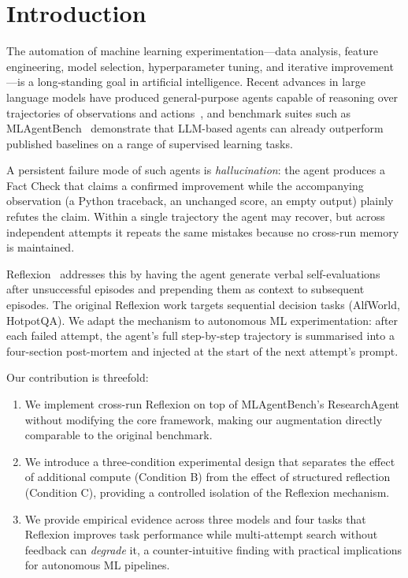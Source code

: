 \documentclass[conference]{IEEEtran}
\begin{document}
\section{Introduction}

The automation of machine learning experimentation---data analysis, feature
engineering, model selection, hyperparameter tuning, and iterative
improvement---is a long-standing goal in artificial intelligence. Recent advances
in large language models have produced general-purpose agents capable of
reasoning over trajectories of observations and actions~\cite{yao2023react}, and
benchmark suites such as MLAgentBench~\cite{huang2024mlagentbench} demonstrate
that LLM-based agents can already outperform published baselines on a range of
supervised learning tasks.

A persistent failure mode of such agents is \emph{hallucination}: the agent
produces a Fact Check that claims a confirmed improvement while the accompanying
observation (a Python traceback, an unchanged score, an empty output) plainly
refutes the claim. Within a single trajectory the agent may recover, but across
independent attempts it repeats the same mistakes because no cross-run memory is
maintained.

Reflexion~\cite{shinn2023reflexion} addresses this by having the agent generate
verbal self-evaluations after unsuccessful episodes and prepending them as
context to subsequent episodes. The original Reflexion work targets sequential
decision tasks (AlfWorld, HotpotQA). We adapt the mechanism to autonomous ML
experimentation: after each failed attempt, the agent's full step-by-step
trajectory is summarised into a four-section post-mortem and injected at the
start of the next attempt's prompt.

Our contribution is threefold:
\begin{enumerate}
  \item We implement cross-run Reflexion on top of MLAgentBench's
        ResearchAgent without modifying the core framework, making our
        augmentation directly comparable to the original benchmark.
  \item We introduce a three-condition experimental design that separates the
        effect of additional compute (Condition B) from the effect of structured
        reflection (Condition C), providing a controlled isolation of the
        Reflexion mechanism.
  \item We provide empirical evidence across three models and four tasks that
        Reflexion improves task performance while multi-attempt search without
        feedback can \emph{degrade} it, a counter-intuitive finding with
        practical implications for autonomous ML pipelines.
\end{enumerate}
\end{document}
